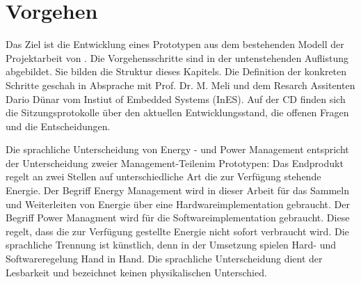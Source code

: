 \chapter{Vorgehen}
 
Das Ziel ist die Entwicklung eines Prototypen aus dem bestehenden Modell der Projektarbeit von \cite{PA_bicycle}. Die Vorgehensschritte sind in der untenstehenden Auflistung abgebildet. Sie bilden die Struktur dieses Kapitels. Die Definition der konkreten Schritte geschah in Absprache mit Prof. Dr. M. Meli und dem Resarch Assitenten Dario Dünar vom Instiut of Embedded Systems (InES). Auf der CD finden sich die Sitzungsprotokolle über den aktuellen Entwicklungsstand, die offenen Fragen und die Entscheidungen.

%  
%  
%      


Die sprachliche Unterscheidung von Energy - und Power Management entspricht der Unterscheidung zweier \glqq Management-Teilen\grqq im Prototypen: Das Endprodukt regelt an zwei Stellen auf unterschiedliche Art die zur Verfügung stehende Energie. Der Begriff Energy Management wird in dieser Arbeit für das Sammeln und Weiterleiten von Energie über eine Hardwareimplementation gebraucht. Der Begriff Power Managment wird für die Softwareimplementation gebraucht. Diese regelt, dass die zur Verfügung gestellte Energie nicht sofort verbraucht wird. Die sprachliche Trennung ist künstlich, denn in der Umsetzung spielen Hard- und Softwareregelung Hand in Hand. Die sprachliche Unterscheidung dient der Lesbarkeit und bezeichnet keinen physikalischen Unterschied.
 
